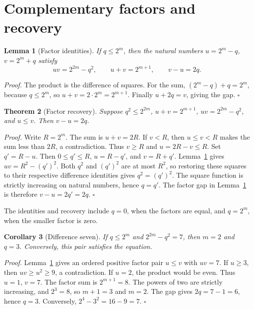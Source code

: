 \documentclass[11pt,letterpaper]{article}
\newtheorem{theorem}{Theorem}
\newtheorem{lemma}[theorem]{Lemma}
\newtheorem{corollary}[theorem]{Corollary}
\newenvironment{proof}{\noindent\textit{Proof.}}{\hfill\(\square\)}
\begin{document}
\section{Complementary factors and recovery}

\begin{lemma}[Factor identities]
\label{lem:split}
If \(q\le2^m\), then the natural numbers \(u=2^m-q\), \(v=2^m+q\) satisfy
\[
uv=2^{2m}-q^2,\qquad u+v=2^{m+1},\qquad v-u=2q.
\]
\end{lemma}

\begin{proof}
The product is the difference of squares. For the sum,
\((2^m-q)+q=2^m\), because \(q\le2^m\), so
\(u+v=2\cdot2^m=2^{m+1}\). Finally \(u+2q=v\), giving the gap.
\end{proof}

\begin{theorem}[Factor recovery]
\label{thm:recovery}
Suppose \(q^2\le2^{2m}\), \(u+v=2^{m+1}\),
\(uv=2^{2m}-q^2\), and \(u\le v\). Then \(v-u=2q\).
\end{theorem}

\begin{proof}
Write \(R=2^m\). The sum is \(u+v=2R\). If \(v<R\), then
\(u\le v<R\) makes the sum less than \(2R\), a contradiction.
Thus \(v\ge R\) and \(u=2R-v\le R\).
Set \(q'=R-u\). Then \(0\le q'\le R\), \(u=R-q'\), and
\(v=R+q'\). Lemma~\ref{lem:split} gives
\(uv=R^2-(q')^2\). Both \(q^2\) and \((q')^2\) are at most \(R^2\),
so restoring these squares to their respective difference identities gives
\(q^2=(q')^2\). The square function is strictly increasing on natural
numbers, hence \(q=q'\). The factor gap in Lemma~\ref{lem:split} is
therefore \(v-u=2q'=2q\).
\end{proof}

The identities and recovery include \(q=0\), when the factors are equal,
and \(q=2^m\), when the smaller factor is zero.

\begin{corollary}[Difference seven]
\label{cor:seven}
If \(q\le2^m\) and \(2^{2m}-q^2=7\), then \(m=2\) and \(q=3\).
Conversely, this pair satisfies the equation.
\end{corollary}

\begin{proof}
Lemma~\ref{lem:split} gives an ordered positive factor pair \(u\le v\)
with \(uv=7\). If \(u\ge3\), then \(uv\ge u^2\ge9\), a contradiction.
If \(u=2\), the product would be even. Thus \(u=1\), \(v=7\).
The factor sum is \(2^{m+1}=8\). The powers of two are strictly increasing,
and \(2^3=8\), so \(m+1=3\) and \(m=2\). The gap gives
\(2q=7-1=6\), hence \(q=3\). Conversely, \(2^4-3^2=16-9=7\).
\end{proof}
\end{document}
